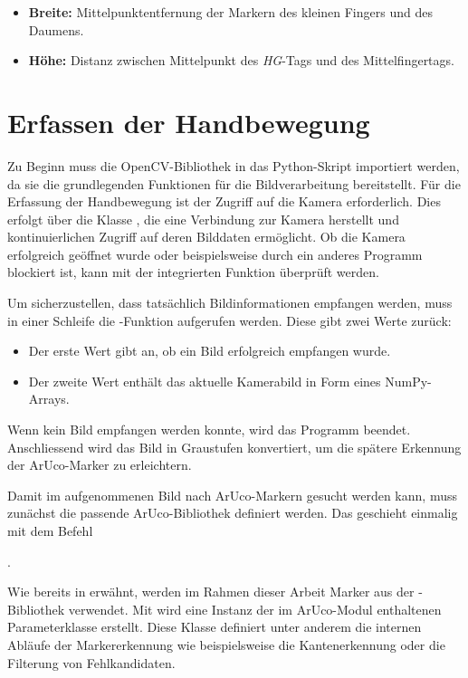 \begin{itemize}
    \item \textbf{Breite:} Mittelpunktentfernung der Markern des kleinen Fingers und des Daumens.
    \item \textbf{Höhe:} Distanz zwischen Mittelpunkt des \textit{HG}-Tags und des Mittelfingertags.
\end{itemize}

\section{Erfassen der Handbewegung}
Zu Beginn muss die OpenCV-Bibliothek in das Python-Skript importiert werden, da sie die grundlegenden Funktionen für die Bildverarbeitung bereitstellt.
Für die Erfassung der Handbewegung ist der Zugriff auf die Kamera erforderlich.
Dies erfolgt über die Klasse , die eine Verbindung zur Kamera herstellt und kontinuierlichen Zugriff auf deren Bilddaten ermöglicht.
Ob die Kamera erfolgreich geöffnet wurde oder beispielsweise durch ein anderes Programm blockiert ist, kann mit der integrierten Funktion  überprüft werden.

Um sicherzustellen, dass tatsächlich Bildinformationen empfangen werden, muss in einer Schleife die -Funktion aufgerufen werden.
Diese gibt zwei Werte zurück:

\begin{itemize}
    \item Der erste Wert gibt an, ob ein Bild erfolgreich empfangen wurde.\footnotemark{}
    \item Der zweite Wert enthält das aktuelle Kamerabild in Form eines NumPy-Arrays.\footnotemark{}
\end{itemize}

Wenn kein Bild empfangen werden konnte, wird das Programm beendet.
Anschliessend wird das Bild in Graustufen konvertiert, um die spätere Erkennung der ArUco-Marker zu erleichtern.

Damit im aufgenommenen Bild nach ArUco-Markern gesucht werden kann, muss zunächst die passende ArUco-Bibliothek definiert werden.
Das geschieht einmalig mit dem Befehl

.

Wie bereits in  erwähnt, werden im Rahmen dieser Arbeit Marker aus der -Bibliothek verwendet.
Mit  wird eine Instanz der im ArUco-Modul enthaltenen Parameterklasse erstellt.
Diese Klasse definiert unter anderem die internen Abläufe der Markererkennung wie beispielsweise die Kantenerkennung oder die Filterung von Fehlkandidaten.

